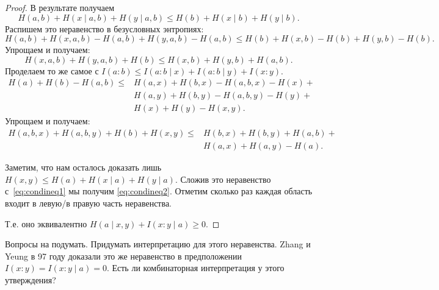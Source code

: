 \documentclass[12pt]{article}
\theoremstyle{definition}
\theoremstyle{plain}
\theoremstyle{remark}
\begin{document}
\begin{proof}
    В результате получаем
    \[
        H(a,b) + H(x\mid a,b) + H(y\mid a,b) \le H(b) + H(x\mid b) + H(y\mid b).
    \]
    Распишем это неравенство в безусловных энтропиях:
    \[
        H(a,b) + H(x,a,b) - H(a,b) + H(y, a,b) - H(a,b) \le H(b) + H(x, b) - H(b) + H(y, b) - H(b).
    \]
    Упрощаем и получаем:
    \begin{equation}\label{eq:condineq1}
        H(x,a,b) + H(y,a,b) + H(b) \le H(x,b) + H(y,b) + H(a,b).
    \end{equation}
    Проделаем то же самое с 
    $I(a:b)\le I(a:b\mid x) + I(a:b\mid y) + I(x:y).$
    \begin{equation*}
        \begin{array}{ll}
        H(a) + H(b) - H(a,b) \le 
        & H(a,x) + H(b,x) - H(a,b,x) - H(x) +\mbox{} \\
        & H(a,y)+ H(b,y) - H(a,b,y) - H(y) + \mbox{} \\
        & H(x) + H(y) - H(x,y).
        \end{array}
    \end{equation*}
    Упрощаем и получаем:
    \begin{equation}\label{eq:condineq2}
        \begin{array}{ll}
        H(a,b,x) + H(a,b,y) + H(b) + H(x,y) \le 
        & H(b,x) + H(b,y)  + H(a,b) + \mbox{} \\
        & H(a,x) + H(a,y) - H(a).
        \end{array}
    \end{equation}

    Заметим, что нам осталось доказать лишь $H(x,y)\le H(a) + H(x\mid a) + H(y\mid a)$. 
    Сложив это неравенство с~\eqref{eq:condineq1} мы получим \eqref{eq:condineq2}.
    Отметим сколько раз каждая область входит в левую/в правую часть неравенства.
    \begin{center}
    \end{center}
    Т.е. оно эквивалентно $H(a\mid x,y) + I(x:y\mid a) \ge 0.$
\end{proof}
Вопросы на подумать. Придумать интерпретацию для этого неравенства. Zhang и Yeung в 97 году доказали это же
неравенство в предположении $I(x:y) = I(x:y\mid a) = 0$. Есть ли комбинаторная интерпретация у этого
утверждения?
\end{document}
